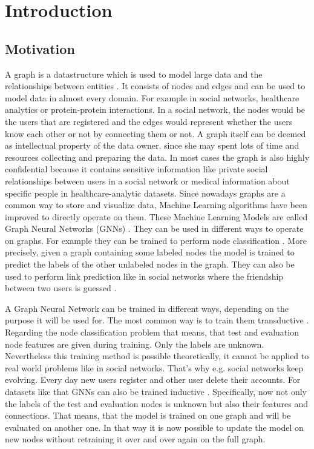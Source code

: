 \chapter{Introduction}


	\section{Motivation}
		A graph is a datastructure which is used to model large data and the relationships between entities .
		It consists of nodes and edges and can be used to model data in almost every domain.
		For example in social networks, healthcare analytics or protein-protein interactions.
		In a social network, the nodes would be the users that are registered and the edges would represent whether the users know each other or not by connecting them or not.
		A graph itself can be deemed as intellectual property of the data owner, since she may spent lots of time and resources collecting and preparing the data.
		In most cases the graph is also highly confidential because it contains sensitive information like private social relationships between users in a social network or medical information about specific people in healthcare-analytic datasets.
		Since nowadays graphs are a common way to store and visualize data, Machine Learning algorithms have been improved to directly operate on them.
		These Machine Learning Models are called Graph Neural Networks (GNNs) .
		They can be used in different ways to operate on graphs.
		For example they can be trained to perform node classification .
		More precisely, given a graph containing some labeled nodes the model is trained to predict the labels of the other unlabeled nodes in the graph.
		They can also be used to perform link prediction like in social networks where the friendship between two users is guessed .

		A Graph Neural Network can be trained in different ways, depending on the purpose it will be used for.
		The most common way is to train them transductive .
		Regarding the node classification problem that means, that test and evaluation node features are given during training.
		Only the labels are unknown.
		Nevertheless this training method is possible theoretically, it cannot be applied to real world problems like in social networks.
		That's why e.g. social networks keep evolving.
		Every day new users register and other user delete their accounts.
		For datasets like that GNNs can also be trained inductive .
		Specifically, now not only the labels of the test and evaluation nodes is unknown but also their features and connections.
		That means, that the model is trained on one graph and will be evaluated on another one.
		In that way it is now possible to update the model on new nodes without retraining it over and over again on the full graph.

